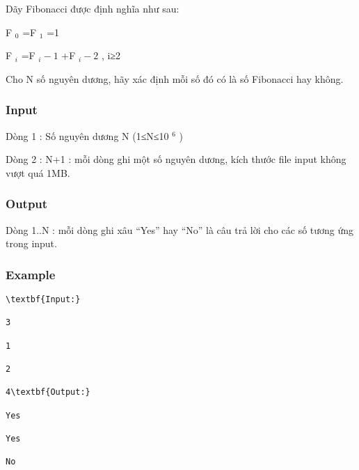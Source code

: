 



   Dãy Fibonacci được định nghĩa như sau:  

   F   $_    0   $   =F   $_    1   $   =1  

   F   $_    i   $   =F   $_    i-1   $   +F   $_    i-2   $   ­, i≥2  

   Cho N số nguyên dương, hãy xác định mỗi số đó có là số Fibonacci hay không.  

\subsubsection{   Input  }

   Dòng 1 : Số nguyên dương N (1≤N≤10   $^    6   $   )  

   Dòng 2 : N+1 : mỗi dòng ghi một số nguyên dương, kích thước file input không vượt quá 1MB.  

\subsubsection{   Output  }

   Dòng 1..N : mỗi dòng ghi xâu “Yes” hay “No” là câu trả lời cho các số tương ứng trong input.  

\subsubsection{   Example  }
\begin{verbatim}
\textbf{Input:}

3

1

2

4\textbf{Output:}

Yes

Yes

No\end{verbatim}